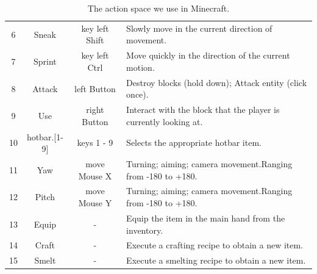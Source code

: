 \begin{table}[H]
{\begin{tabular}{@{}cccl@{}}
6              & Sneak            & key left Shift        & Slowly move in the current direction of movement. \\
7              & Sprint           & key left Ctrl         & Move quickly in the direction of the current motion.                                                                                                                                                                                                                                                                 \\
8              & Attack           & left Button     & Destroy blocks (hold down); Attack entity (click once).                                                                                                                                                                                                                                                          \\
9              & Use              & right Button    & Interact with the block that the player is currently looking at.                                                                                                 \\
10             & hotbar.{[}1-9{]} & keys 1 - 9            & Selects the appropriate hotbar item.                                                                                                                                                \\
11             & Yaw              & move Mouse X      & Turning; aiming; camera movement.Ranging from -180 to +180.                                                                                                                                                                                                                                                      \\
12             & Pitch            & move Mouse Y      & Turning; aiming; camera movement.Ranging from -180 to +180.  \\

\midrule

13             & Equip            & -      & Equip the item in the main hand from the inventory.  \\

14             & Craft            & -      & Execute a crafting recipe to obtain a new item.  \\

15             & Smelt            & -      & Execute a smelting recipe to obtain a new item.  


\\ \bottomrule
\end{tabular}}
\captionsetup{justification=centering}
\caption{The action space we use in Minecraft.}
\label{tab:action_space}
\end{table}


